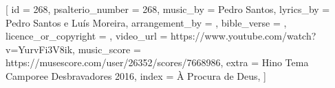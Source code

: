 
[
    id                     = {268},
    psalterio_number       = {268},
    music_by               = {Pedro Santos},
    lyrics_by              = {Pedro Santos e Luís Moreira},
    arrangement_by         = {},
    bible_verse            = {},
    licence_or_copyright   = {},
    video_url              = {https://www.youtube.com/watch?v=YurvFi3V8ik},
    music_score            = {https://musescore.com/user/26352/scores/7668986}, 
    extra                  = {Hino Tema Camporee Desbravadores 2016},
    index                  = {À Procura de Deus},
]


